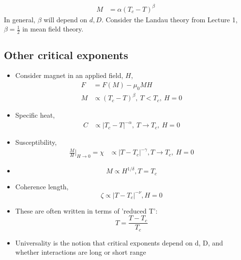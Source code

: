 \documentclass[a4paper, 11pt, normalem]{report}
\begin{document}
\begin{example}
    \begin{align}
        M &= \alpha(T_c-T)^\beta
    \end{align}
    In general, $\beta$ will depend on $d,D$.
    Consider the Landau theory from Lecture 1, $\beta = \frac{1}{2}$ in mean field theory.
\end{example}

\subsection{Other critical exponents}
\begin{itemize}
    \item Consider magnet in an applied field, $H$,
        \begin{align}
            F &= F(M) - \mu_0MH \\
            M &\propto (T_c-T)^\beta,~ T < T_c,~ H=0
        \end{align}
    \item Specific heat, 
        \begin{align} 
            C &\propto |T_c-T|^{-\alpha},~ T\to T_c,~ H=0
        \end{align}
    \item Susceptibility,
        \begin{align}
            \frac{M}{H}\bigg|_{H\to 0} = \chi &\propto |T-T_c|^{-\gamma}, T\to T_c,~ H=0
        \end{align}
    \item 
        \begin{equation}
            M \propto H^{1/\delta}, T = T_c
        \end{equation}
    \item Coherence length, 
        \begin{equation}
            \zeta \propto |T-T_c|^{-\nu}, H=0
        \end{equation}
    \item These are often written in terms of 'reduced T':
        \begin{equation}
            T = \frac{T-T_c}{T_c}
        \end{equation}
    \item Universality is the notion that critical exponents depend on d, D, and whether interactions are long or short range
\end{itemize}
\end{document}
